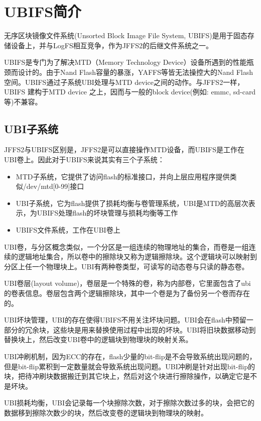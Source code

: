 \chapter{UBIFS简介}
无序区块镜像文件系统(Unsorted Block Image File System, UBIFS)是用于固态存储设备上，并与LogFS相互竞争，作为JFFS2的后继文件系统之一。

UBIFS是专门为了解决MTD（Memory Technology Device）设备所遇到的性能瓶颈而设计的。由于Nand Flash容量的暴涨，YAFFS等皆无法操控大的Nand Flash空间。UBIFS通过子系统UBI处理与MTD device之间的动作。与JFFS2一样，UBIFS 建构于MTD device 之上，因而与一般的block device(例如: emmc, sd-card等)不兼容。

\section{UBI子系统}
JFFS2与UBIFS区别是，JFFS2是可以直接操作MTD设备，而UBIFS是工作在UBI卷上。因此对于UBIFS来说其实有三个子系统：
\begin{itemize}
  \item MTD子系统，它提供了访问flash的标准接口，并向上层应用程序提供类似/dev/mtd[0-99]接口
  \item UBI子系统，它为flash提供了损耗均衡与卷管理系统，UBI是MTD的高层次表示，为UBIFS处理flash的坏块管理与损耗均衡等工作
  \item UBIFS文件系统，工作在UBI卷上
\end{itemize}

UBI卷，与分区概念类似，一个分区是一组连续的物理地址的集合，而卷是一组连续的逻辑地址集合，所以卷中的擦除块又称为逻辑擦除块。这个逻辑块可以映射到分区上任一个物理块上。UBI有两种卷类型，可读写的动态卷与只读的静态卷。

UBI卷层(layout volume)，卷层是一个特殊的卷，称为内部卷，它里面包含了ubi的卷表信息。卷层包含两个逻辑擦除块，其中一个卷是为了备份另一个卷而存在的。

UBI坏块管理，UBI的存在使得UBIFS不用关注坏块问题。UBI会在flash中预留一部分的冗余块，这些块是用来替换使用过程中出现的坏块。UBI将旧块数据移动到替换块上，然后改变UBI卷中的逻辑块到物理块的映射关系。

UBI冲刷机制，因为ECC的存在，flash少量的bit-flip是不会导致系统出现问题的，但是bit-flip累积到一定数量就会导致系统出现问题。UBI冲刷是针对出现bit-flip的块，把待冲刷块数据搬迁到其它块上，然后对这个块进行擦除操作，以确定它是不是坏块。

UBI损耗均衡，UBI会记录每一个块擦除次数，对于擦除次数过多的块，会把它的数据移到擦除次数少的块，然后改变卷的逻辑块到物理块的映射。

